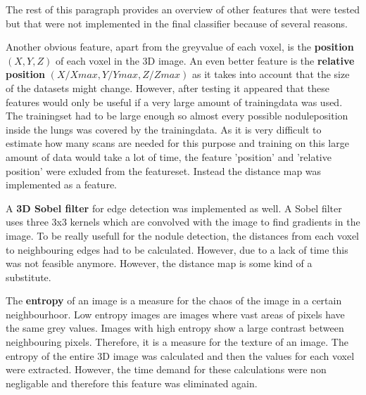 The rest of this paragraph provides an overview of other features that were
tested but that were not implemented in the final classifier because of several
reasons.

Another obvious feature, apart from the greyvalue of each voxel, is the
\textbf{position} $(X, Y, Z)$ of each voxel in the 3D image. An even better
feature is the \textbf{relative position} $(X/Xmax, Y/Ymax, Z/Zmax)$ as it takes
into account that the size of the datasets might change. However, after testing it appeared that
these features would only be useful if a very large amount of trainingdata was
used. The trainingset had to be large enough so almost every possible
noduleposition inside the lungs was covered by the trainingdata. As it is very
difficult to estimate how many scans are needed for this purpose and training
on this large amount of data would take a lot of time, the feature 'position'
and 'relative position' were exluded from the featureset. Instead the distance
map was implemented as a feature.

A \textbf{3D Sobel filter} for edge detection was implemented as well. A Sobel
filter uses three 3x3 kernels which are convolved with the image to find
gradients in the image. To be really usefull for the nodule detection, the
distances from each voxel to neighbouring edges had to be calculated. However,
due to a lack of time this was not feasible anymore. However, the
distance map is some kind of a substitute.

The \textbf{entropy} of an image is a measure for the chaos of the image
in a certain neighbourhoor. Low
entropy images are images where vast areas of pixels have the same grey
values. Images with high entropy show a large contrast between neighbouring
pixels. Therefore, it is a measure for the texture of an image. The entropy of
the entire 3D image was calculated and then the values for each voxel were
extracted. However, the time demand for these calculations were non negligable
and therefore this feature was eliminated again.

